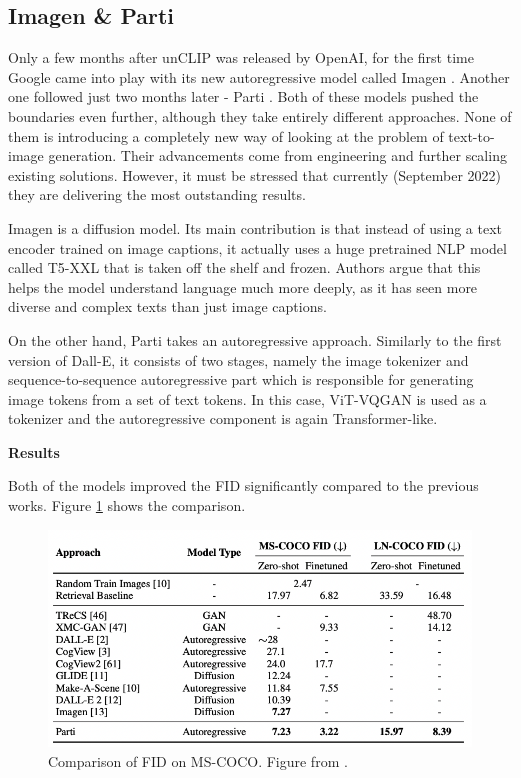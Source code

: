 \documentclass[
]{krantz}
\begin{document}
\hypertarget{imagen-parti}{%
\subsection{Imagen \& Parti}\label{imagen-parti}}

Only a few months after unCLIP was released by OpenAI, for the first time Google came into play with its new autoregressive model called Imagen \citep{Imagen2022}. Another one followed just two months later - Parti \citep{Parti2022}. Both of these models pushed the boundaries even further, although they take entirely different approaches. None of them is introducing a completely new way of looking at the problem of text-to-image generation. Their advancements come from engineering and further scaling existing solutions. However, it must be stressed that currently (September 2022) they are delivering the most outstanding results.

Imagen is a diffusion model. Its main contribution is that instead of using a text encoder trained on image captions, it actually uses a huge pretrained NLP model called T5-XXL \citep{T5XXL2019} that is taken off the shelf and frozen. Authors argue that this helps the model understand language much more deeply, as it has seen more diverse and complex texts than just image captions.

On the other hand, Parti takes an autoregressive approach. Similarly to the first version of Dall-E, it consists of two stages, namely the image tokenizer and sequence-to-sequence autoregressive part which is responsible for generating image tokens from a set of text tokens. In this case, ViT-VQGAN \citep{VitVQGAN2021} is used as a tokenizer and the autoregressive component is again Transformer-like.

\textbf{Results}

Both of the models improved the FID significantly compared to the previous works. Figure \ref{fig:partiresults} shows the comparison.

\begin{figure}

{\centering \includegraphics[width=0.8\linewidth]{figures/02-02-text-2-img/partiresults} 

}

\caption{Comparison of FID on MS-COCO. Figure from \citet{Parti2022}.}\label{fig:partiresults}
\end{figure}
\end{document}
